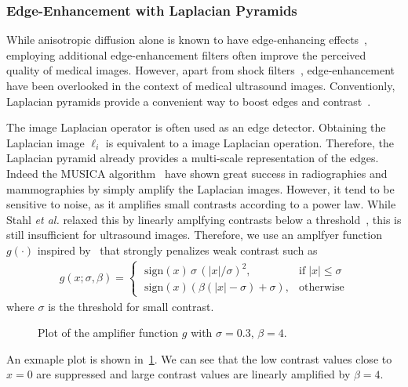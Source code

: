 \subsubsection{Edge-Enhancement with Laplacian Pyramids}
%
While anisotropic diffusion alone is known to have edge-enhancing effects~\cite{weickert_anisotropic_1998}, employing additional edge-enhancement filters often improve the perceived quality of medical images.
However, apart from shock filters~\cite{zhang_multiscale_2006, kang_new_2016}, edge-enhancement have been overlooked in the context of medical ultrasound images.
Conventionly, Laplacian pyramids provide a convenient way to boost edges and contrast~\cite{vuylsteke_multiscale_1994, stahl_noiseresistant_1999, dippel_multiscale_2002}.

The image Laplacian operator is often used as an edge detector.
Obtaining the Laplacian image \({\boldsymbol\ell_i}\) is equivalent to a image Laplacian operation.
Therefore, the Laplacian pyramid already provides a multi-scale representation of the edges.
Indeed the MUSICA algorithm~\cite{vuylsteke_multiscale_1994} have shown great success in radiographies and mammographies by simply amplify the Laplacian images.
However, it tend to be sensitive to noise, as it amplifies small contrasts according to a power law.
While Stahl \textit{et al.} relaxed this by linearly amplfying contrasts below a threshold~\cite{stahl_noiseresistant_1999}, this is still insufficient for ultrasound images.
Therefore, we use an amplfyer function \(g\left(\cdot\right)\) inspired by~\cite{10.1145/2010324.1964963} that strongly penalizes weak contrast such as
\begin{align}
  g\left(x; \sigma, \beta \right) =
  \begin{cases}
    \;\mathrm{sign}\left( x \right) \, \sigma \, {\left( |x|/\sigma \right)}^2, & \text{if}\; |x| \leq \sigma \\
    \;\mathrm{sign}\left( x \right) \left( \beta \left(|x| - \sigma \right) + \sigma \right), & \text{otherwise}
  \end{cases}
\end{align}
where \(\sigma\) is the threshold for small contrast.
%
\begin{figure}[H]
  \centering
  \caption{Plot of the amplifier function \(g\) with \(\sigma=0.3\), \(\beta=4\).}\label{fig:amp}
\end{figure}
%
An exmaple plot is shown in~\cref{fig:amp}.
We can see that the low contrast values close to \(x=0\) are suppressed and large contrast values are linearly amplified by \(\beta=4\).

